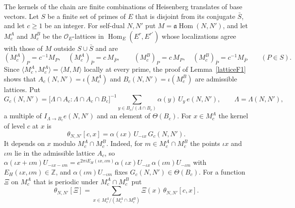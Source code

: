 The kernels of the chain are finite combinations of Heisenberg translates of base vectors. Let $S$ be a finite set of primes of $E$ that is disjoint from its conjugate $\bar S$, and let $c\ge1$ be an integer. For self-dual $N,N'$ put $M=\mathfrak a\operatorname{Hom}(N,N')$, and let $M^A_c$ and $M^B_c$ be the $\mathcal O_E$-lattices in $\operatorname{Hom}_E(E^r,E^{r'})$ whose localizations agree with those of $M$ outside $S\cup\bar S$ and are
\[
(M^A_c)_P=c^{-1}M_P,\quad(M^A_c)_{\bar P}=c\,M_{\bar P},\qquad(M^B_c)_P=c\,M_P,\quad(M^B_c)_{\bar P}=c^{-1}M_{\bar P}\qquad(P\in S).
\]
Since $\langle M^A_c,M^A_c\rangle=\langle M,M\rangle$ locally at every prime, the proof of Lemma~\ref{latticeF1} shows that $A_c(N,N')=\iota(M^A_c)$ and $B_c(N,N')=\iota(M^B_c)$ are admissible lattices. Put
\[
G_c(N,N')=\big[\Lambda\cap A_c:\Lambda\cap A_c\cap B_c\big]^{-1}\sum_{y\in B_c/(\Lambda\cap B_c)}\alpha(y)\,U_y\,e(N,N'),\qquad\Lambda=\Lambda(N,N'),
\]
a multiple of $I_{\Lambda\to B_c}e(N,N')$ and an element of $\Theta(B_c)$. For $x\in M^A_c$ the kernel of level $c$ at $x$ is
\begin{equation}\label{kernelcx}
\theta_{N,N'}[c,x]=\alpha(\iota x)\,U_{-\iota x}\,G_c(N,N').
\end{equation}
It depends on $x$ modulo $M^A_c\cap M^B_c$. Indeed, for $m\in M^A_c\cap M^B_c$ the points $\iota x$ and $\iota m$ lie in the admissible lattice $A_c$, so $\alpha(\iota x+\iota m)U_{-\iota x-\iota m}=e^{2\pi iE_H(\iota x,\iota m)}\alpha(\iota x)U_{-\iota x}\,\alpha(\iota m)U_{-\iota m}$ with $E_H(\iota x,\iota m)\in\mathbb Z$, and $\alpha(\iota m)U_{-\iota m}$ fixes $G_c(N,N')\in\Theta(B_c)$. For a function $\Xi$ on $M^A_c$ that is periodic under $M^A_c\cap M^B_c$ put
\begin{equation}\label{datumkernel}
\theta_{N,N'}[\Xi]=\sum_{x\in M^A_c/(M^A_c\cap M^B_c)}\Xi(x)\,\theta_{N,N'}[c,x].
\end{equation}

